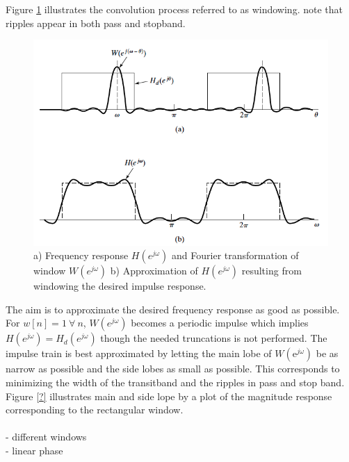 Figure \ref{fig:FIR1} illustrates the convolution process referred to as windowing. note that ripples appear in both pass and stopband. 
\begin{figure}[H]
    \centering
    \includegraphics[scale=0.4]{figures/FIR1.png}
    \caption{a) Frequency response $H(e^{j\omega})$ and Fourier transformation of window $W(e^{j\omega})$ b) Approximation of $H(e^{j\omega})$ resulting from windowing the desired impulse response.}
    \label{fig:FIR1}
\end{figure}  
The aim is to approximate the desired frequency response as good as possible. For $w[n]=1 \ \forall \ n$, $W(e^{j\omega})$ becomes a periodic impulse which implies $H(e^{j\omega})=H_d(e^{j\omega})$ though the needed truncations is not performed. The impulse train is best approximated by letting the main lobe of $W(\text{e}^{j\omega})$ be as narrow as possible and the side lobes as small as possible. This corresponds to minimizing the width of the transitband and the ripples in pass and stop band. \\ 
Figure \ref{?} illustrates main and side lope by a plot of the magnitude response corresponding to the rectangular window.\\
\\
- different windows \\
- linear phase 



